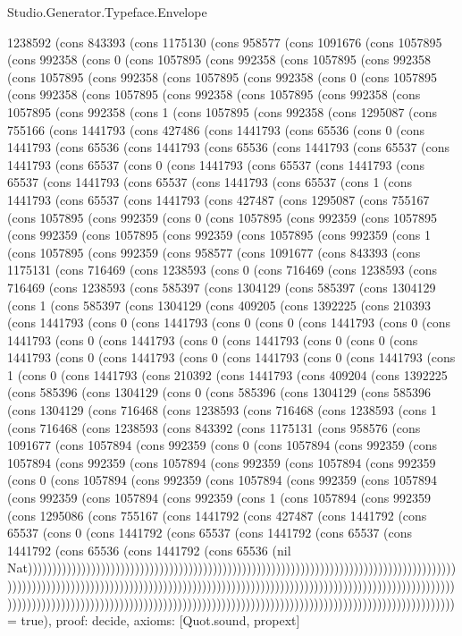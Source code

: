 \begin{lexlean}{Studio.Generator.Typeface.Envelope}
\begin{semanticmodule}
{1238592 (cons 843393 (cons 1175130 (cons 958577 (cons 1091676 (cons 1057895 (cons 992358 (cons 0 (cons 1057895 (cons 992358 (cons 1057895 (cons 992358 (cons 1057895 (cons 992358 (cons 1057895 (cons 992358 (cons 0 (cons 1057895 (cons 992358 (cons 1057895 (cons 992358 (cons 1057895 (cons 992358 (cons 1057895 (cons 992358 (cons 1 (cons 1057895 (cons 992358 (cons 1295087 (cons 755166 (cons 1441793 (cons 427486 (cons 1441793 (cons 65536 (cons 0 (cons 1441793 (cons 65536 (cons 1441793 (cons 65536 (cons 1441793 (cons 65537 (cons 1441793 (cons 65537 (cons 0 (cons 1441793 (cons 65537 (cons 1441793 (cons 65537 (cons 1441793 (cons 65537 (cons 1441793 (cons 65537 (cons 1 (cons 1441793 (cons 65537 (cons 1441793 (cons 427487 (cons 1295087 (cons 755167 (cons 1057895 (cons 992359 (cons 0 (cons 1057895 (cons 992359 (cons 1057895 (cons 992359 (cons 1057895 (cons 992359 (cons 1057895 (cons 992359 (cons 1 (cons 1057895 (cons 992359 (cons 958577 (cons 1091677 (cons 843393 (cons 1175131 (cons 716469 (cons 1238593 (cons 0 (cons 716469 (cons 1238593 (cons 716469 (cons 1238593 (cons 585397 (cons 1304129 (cons 585397 (cons 1304129 (cons 1 (cons 585397 (cons 1304129 (cons 409205 (cons 1392225 (cons 210393 (cons 1441793 (cons 0 (cons 1441793 (cons 0 (cons 0 (cons 1441793 (cons 0 (cons 1441793 (cons 0 (cons 1441793 (cons 0 (cons 1441793 (cons 0 (cons 0 (cons 1441793 (cons 0 (cons 1441793 (cons 0 (cons 1441793 (cons 0 (cons 1441793 (cons 1 (cons 0 (cons 1441793 (cons 210392 (cons 1441793 (cons 409204 (cons 1392225 (cons 585396 (cons 1304129 (cons 0 (cons 585396 (cons 1304129 (cons 585396 (cons 1304129 (cons 716468 (cons 1238593 (cons 716468 (cons 1238593 (cons 1 (cons 716468 (cons 1238593 (cons 843392 (cons 1175131 (cons 958576 (cons 1091677 (cons 1057894 (cons 992359 (cons 0 (cons 1057894 (cons 992359 (cons 1057894 (cons 992359 (cons 1057894 (cons 992359 (cons 1057894 (cons 992359 (cons 0 (cons 1057894 (cons 992359 (cons 1057894 (cons 992359 (cons 1057894 (cons 992359 (cons 1057894 (cons 992359 (cons 1 (cons 1057894 (cons 992359 (cons 1295086 (cons 755167 (cons 1441792 (cons 427487 (cons 1441792 (cons 65537 (cons 0 (cons 1441792 (cons 65537 (cons 1441792 (cons 65537 (cons 1441792 (cons 65536 (cons 1441792 (cons 65536 (nil Nat)))))))))))))))))))))))))))))))))))))))))))))))))))))))))))))))))))))))))))))))))))))))))))))))))))))))))))))))))))))))))))))))))))))))))))))))))))))))))))))))))))))))))))))))))))))))))))))))))))))))))))))))))))))))))))))))))))))))))))))))))))))))))))))))))))))))))))))))) = true),
  proof: decide{},
  axioms: [Quot.sound, propext]
}


\end{semanticmodule}
\end{lexlean}
